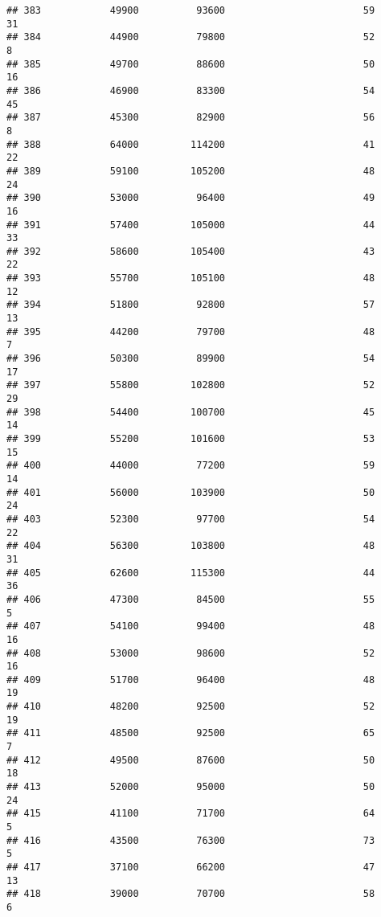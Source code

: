 \documentclass[
]{article}
\begin{document}
\begin{verbatim}
## 383            49900          93600                        59           31
## 384            44900          79800                        52            8
## 385            49700          88600                        50           16
## 386            46900          83300                        54           45
## 387            45300          82900                        56            8
## 388            64000         114200                        41           22
## 389            59100         105200                        48           24
## 390            53000          96400                        49           16
## 391            57400         105000                        44           33
## 392            58600         105400                        43           22
## 393            55700         105100                        48           12
## 394            51800          92800                        57           13
## 395            44200          79700                        48            7
## 396            50300          89900                        54           17
## 397            55800         102800                        52           29
## 398            54400         100700                        45           14
## 399            55200         101600                        53           15
## 400            44000          77200                        59           14
## 401            56000         103900                        50           24
## 403            52300          97700                        54           22
## 404            56300         103800                        48           31
## 405            62600         115300                        44           36
## 406            47300          84500                        55            5
## 407            54100          99400                        48           16
## 408            53000          98600                        52           16
## 409            51700          96400                        48           19
## 410            48200          92500                        52           19
## 411            48500          92500                        65            7
## 412            49500          87600                        50           18
## 413            52000          95000                        50           24
## 415            41100          71700                        64            5
## 416            43500          76300                        73            5
## 417            37100          66200                        47           13
## 418            39000          70700                        58            6

\end{verbatim}
\end{document}
